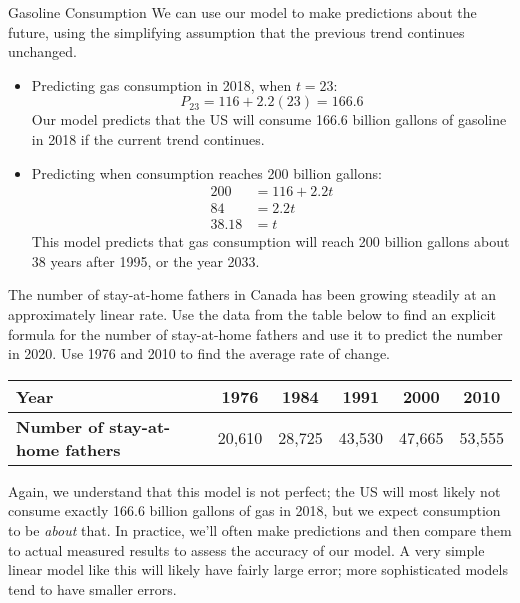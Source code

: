 \begin{example}[https://www.youtube.com/watch?v=QoOdfeLBN0o&list=PLfmpjsIzhztutjEb8Pg5OBOlI1p80yVoy&index=2]{Gasoline Consumption}
We can use our model to make predictions about the future, using the simplifying assumption that the previous trend continues unchanged.
\begin{itemize}
\item Predicting gas consumption in 2018, when $t=23$:
\[P_{23} = 116 + 2.2(23) = \boxed{166.6}\]
Our model predicts that the US will consume 166.6 billion gallons of gasoline in 2018 if the current trend continues.

\item Predicting when consumption reaches 200 billion gallons:
\begin{align*}
200 &= 116 + 2.2t\\
84 &= 2.2t\\
\boxed{38.18} &= t
\end{align*}
This model predicts that gas consumption will reach 200 billion gallons about 38 years after 1995, or the year 2033.
\end{itemize}
\end{example}

\begin{try}
The number of stay-at-home fathers in Canada has been growing steadily at an approximately linear rate.  Use the data from the table below to find an explicit formula for the number of stay-at-home fathers and use it to predict the number in 2020.  Use 1976 and 2010 to find the average rate of change.
\begin{center}
\begin{tabular}{|p{1.25in} | c | c | c | c | c|}
\hline
\textbf{Year} & 1976 & 1984 & 1991 & 2000 & 2010\\
\hline
\textbf{Number of stay-at-home fathers} & 20,610 & 28,725 & 43,530 & 47,665 & 53,555\\
\hline
\end{tabular}
\end{center}
\end{try}

Again, we understand that this model is not perfect; the US will most likely not consume exactly 166.6 billion gallons of gas in 2018, but we expect consumption to be \textit{about} that.  In practice, we'll often make predictions and then compare them to actual measured results to assess the accuracy of our model.  A very simple linear model like this will likely have fairly large error; more sophisticated models tend to have smaller errors.

